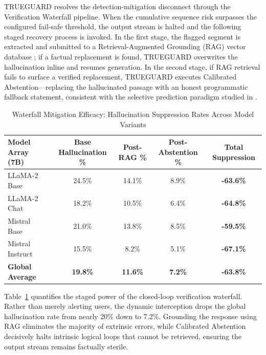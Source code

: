 \documentclass{article}
\begin{document}
TRUEGUARD resolves the detection-mitigation disconnect through the Verification Waterfall pipeline. When the cumulative sequence risk surpasses the configured fail-safe threshold, the output stream is halted and the following staged recovery process is invoked. In the first stage, the flagged segment is extracted and submitted to a Retrieval-Augmented Grounding (RAG) vector database \cite{lewis2020retrieval,yao2025expandr}; if a factual replacement is found, TRUEGUARD overwrites the hallucination inline and resumes generation. In the second stage, if RAG retrieval fails to surface a verified replacement, TRUEGUARD executes Calibrated Abstention---replacing the hallucinated passage with an honest programmatic fallback statement, consistent with the selective prediction paradigm studied in \cite{kadavath2022language,wu2025behcal}.

\begin{table}[!htbp]
\centering
\caption{Waterfall Mitigation Efficacy: Hallucination Suppression Rates Across Model Variants}
\label{tab:mitigation}
\renewcommand{\arraystretch}{1.3}
\begin{tabularx}{1.0\textwidth}{X c c c c}
\toprule
\textbf{Model Array (7B)} & \textbf{Base Hallucination \%} & \textbf{Post-RAG \%} & \textbf{Post-Abstention \%} & \textbf{Total Suppression} \\
\midrule
LLaMA-2 Base & 24.5\% & 14.1\% & 8.9\% & \textbf{-63.6\%} \\
LLaMA-2 Chat & 18.2\% & 10.5\% & 6.4\% & \textbf{-64.8\%} \\
Mistral Base & 21.0\% & 13.8\% & 8.5\% & \textbf{-59.5\%} \\
Mistral Instruct & 15.5\% & 8.2\% & 5.1\% & \textbf{-67.1\%} \\
\midrule
\textbf{Global Average} & \textbf{19.8\%} & \textbf{11.6\%} & \textbf{7.2\%} & \textbf{-63.8\%} \\
\bottomrule
\end{tabularx}
\end{table}

Table~\ref{tab:mitigation} quantifies the staged power of the closed-loop verification waterfall. Rather than merely alerting users, the dynamic interception drops the global hallucination rate from nearly 20\% down to 7.2\%. Grounding the response using RAG eliminates the majority of extrinsic errors, while Calibrated Abstention decisively halts intrinsic logical loops that cannot be retrieved, ensuring the output stream remains factually sterile.
\end{document}
